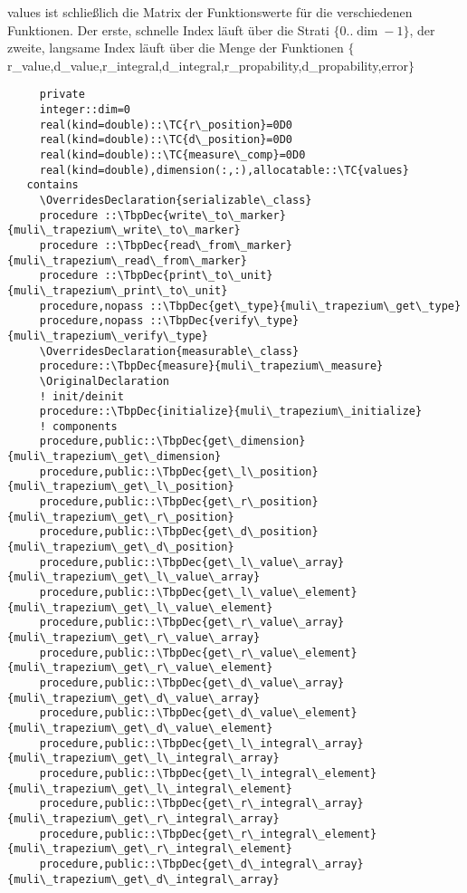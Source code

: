 values ist schließlich die Matrix der Funktionswerte für die verschiedenen Funktionen. Der erste, schnelle Index läuft über die Strati $\{0 .. \dim-1\}$, der zweite, langsame Index läuft über die Menge der Funktionen $\{$r\_value,d\_value,r\_integral,d\_integral,r\_propability,d\_propability,error$\}$
\begin{Verbatim}
     private
     integer::dim=0
     real(kind=double)::\TC{r\_position}=0D0
     real(kind=double)::\TC{d\_position}=0D0
     real(kind=double)::\TC{measure\_comp}=0D0
     real(kind=double),dimension(:,:),allocatable::\TC{values}
   contains
     \OverridesDeclaration{serializable\_class}
     procedure ::\TbpDec{write\_to\_marker}{muli\_trapezium\_write\_to\_marker}
     procedure ::\TbpDec{read\_from\_marker}{muli\_trapezium\_read\_from\_marker}
     procedure ::\TbpDec{print\_to\_unit}{muli\_trapezium\_print\_to\_unit}
     procedure,nopass ::\TbpDec{get\_type}{muli\_trapezium\_get\_type}
     procedure,nopass ::\TbpDec{verify\_type}{muli\_trapezium\_verify\_type}
     \OverridesDeclaration{measurable\_class}
     procedure::\TbpDec{measure}{muli\_trapezium\_measure}
     \OriginalDeclaration
     ! init/deinit
     procedure::\TbpDec{initialize}{muli\_trapezium\_initialize}
     ! components    
     procedure,public::\TbpDec{get\_dimension}{muli\_trapezium\_get\_dimension}
     procedure,public::\TbpDec{get\_l\_position}{muli\_trapezium\_get\_l\_position}
     procedure,public::\TbpDec{get\_r\_position}{muli\_trapezium\_get\_r\_position}
     procedure,public::\TbpDec{get\_d\_position}{muli\_trapezium\_get\_d\_position}
     procedure,public::\TbpDec{get\_l\_value\_array}{muli\_trapezium\_get\_l\_value\_array}
     procedure,public::\TbpDec{get\_l\_value\_element}{muli\_trapezium\_get\_l\_value\_element}
     procedure,public::\TbpDec{get\_r\_value\_array}{muli\_trapezium\_get\_r\_value\_array}
     procedure,public::\TbpDec{get\_r\_value\_element}{muli\_trapezium\_get\_r\_value\_element}
     procedure,public::\TbpDec{get\_d\_value\_array}{muli\_trapezium\_get\_d\_value\_array}
     procedure,public::\TbpDec{get\_d\_value\_element}{muli\_trapezium\_get\_d\_value\_element}
     procedure,public::\TbpDec{get\_l\_integral\_array}{muli\_trapezium\_get\_l\_integral\_array}
     procedure,public::\TbpDec{get\_l\_integral\_element}{muli\_trapezium\_get\_l\_integral\_element}
     procedure,public::\TbpDec{get\_r\_integral\_array}{muli\_trapezium\_get\_r\_integral\_array}
     procedure,public::\TbpDec{get\_r\_integral\_element}{muli\_trapezium\_get\_r\_integral\_element}
     procedure,public::\TbpDec{get\_d\_integral\_array}{muli\_trapezium\_get\_d\_integral\_array}

\end{Verbatim}
